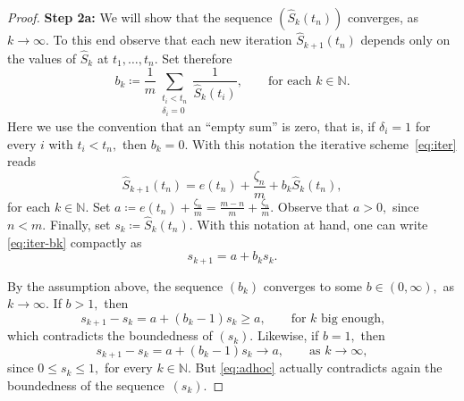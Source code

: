 \documentclass{amsart}
\theoremstyle{plain}
\theoremstyle{definition}
\def\l{\left}
\def\r{\right}
\def\as{\coloneqq}
\def\nat{\mathbb{N}}
\newcommand{\rec}[1]{\frac{1}{#1}}
\renewcommand{\hat}{\widehat}
\begin{document}
\begin{proof}
\textbf{Step 2a:} We will show that the sequence $\l(\hat{S}_k\l(t_n\r)\r)$ converges, as $k\to\infty.$ To this end observe that each new iteration $\hat{S}_{k+1}\l(t_n\r)$ depends only on the values of $\hat{S}_k$ at $t_1,\dots, t_n.$ Set therefore
\begin{equation} \label{eq:bk-notation}
b_k\as \rec{m} \sum_{\substack{t_i< t_n \\ \delta_i=0}}\rec{\hat{S}_k\l(t_i\r)},\qquad\text{for each } k\in\nat.                                                                                                                                                                                                                                                                                                                                                                                                                                                                \end{equation}
Here we use the convention that an ``empty sum'' is zero, that is, if $\delta_i=1$ for every $i$ with $t_i< t_n,$ then $b_k=0.$ With this notation the iterative scheme~\eqref{eq:iter} reads
\begin{equation} \label{eq:iter-bk}
 \hat{S}_{k+1} \l(t_n\r) = e\l(t_n\r) +\frac{\zeta_n}{m} + b_k \hat{S}_k \l(t_n\r), 
\end{equation}
for each $k\in\nat.$ Set $a\as e\l(t_n\r)+\frac{\zeta_n}{m}=\frac{m-n}{m}+\frac{\zeta_n}{m}.$ Observe that $a>0,$ since $n<m.$ Finally, set $s_k \as \hat{S}_k\l(t_n\r).$ With this notation at hand, one can write \eqref{eq:iter-bk} compactly as
\begin{equation*}
 s_{k+1}= a + b_k s_k.
\end{equation*}

By the assumption above, the sequence $\l(b_k\r)$ converges to some $b\in(0,\infty),$ as $k\to\infty.$ If $b>1,$ then
\begin{equation*}
 s_{k+1}-s_k=a+ \l(b_k-1\r)s_k \ge a,\qquad \text{for } k \text{ big enough,}
\end{equation*}
which contradicts the boundedness of $\l(s_k\r).$ Likewise, if $b=1,$ then
\begin{equation} \label{eq:adhoc}
 s_{k+1}-s_k=a+ \l(b_k-1\r)s_k \to a,\qquad \text{as } k\to\infty,
\end{equation}
since $0\le s_k\le 1,$ for every $k\in\nat.$ But \eqref{eq:adhoc} actually contradicts again the boundedness of the sequence~$\l(s_k\r).$ 


\end{proof}
\end{document}
